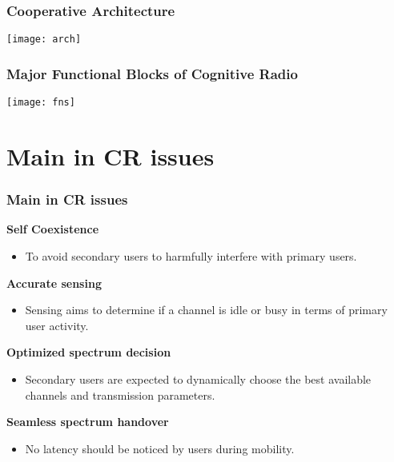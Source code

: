 \documentclass{beamer}
\begin{document}
\begin{frame}
\frametitle{Cooperative Architecture}
\texttt{[image: arch]}
\end{frame}

\begin{frame}
\frametitle{Major Functional Blocks of Cognitive Radio}
\texttt{[image: fns]}
\end{frame}

\section{Main in CR issues}
\begin{frame}
\frametitle{Main in CR issues}
\textbf{Self Coexistence}\\
\begin{itemize}
\item To avoid secondary users to harmfully interfere with primary users.\\ 
\end{itemize}
\textbf{Accurate sensing}\\
\begin{itemize}
\item Sensing aims to determine if a channel is idle or busy in terms of primary user activity.\\
 \end{itemize}
\textbf{Optimized spectrum decision}\\
\begin{itemize}
\item Secondary users are expected to dynamically choose the best available channels and transmission parameters.\\
\end{itemize} 
\textbf{Seamless spectrum handover}\\
\begin{itemize}
\item No latency should be noticed by users during mobility.
\end{itemize} 
\end{frame}
\end{document}

